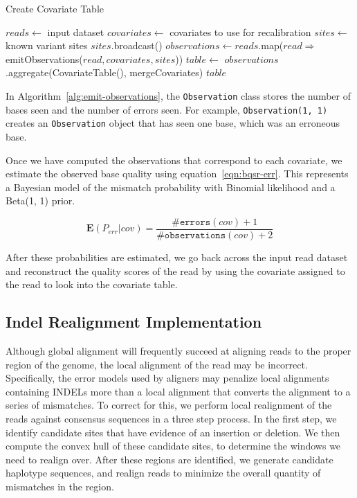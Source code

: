 \documentclass[masters]{ucbthesis}
\begin{document}
\begin{algorithm}
\caption{Create Covariate Table}
\label{alg:create-table}
\begin{algorithmic}
\STATE $reads \leftarrow$ input dataset
\STATE $covariates \leftarrow$ covariates to use for recalibration
\STATE $sites \leftarrow$ known variant sites
\STATE $sites$.broadcast()
\STATE $observations \leftarrow reads$.map($read \Rightarrow$ emitObservations($read, covariates, sites$))
\STATE $table \leftarrow$ $observations$.aggregate(CovariateTable(), mergeCovariates)
\RETURN $table$
\end{algorithmic}
\end{algorithm}

In Algorithm~\ref{alg:emit-observations}, the \texttt{Observation} class stores the number of bases seen
and the number of errors seen. For example, \texttt{Observation(1, 1)} creates an \texttt{Observation} object
that has seen one base, which was an erroneous base.

Once we have computed the observations that correspond to each covariate, we estimate the observed base
quality using equation~\eqref{eqn:bqsr-err}. This represents a Bayesian model of the mismatch probability with
Binomial likelihood and a Beta(1, 1) prior.

\begin{equation}
\label{eqn:bqsr-err}
\mathbf{E}(P_{err}|{cov}) = \frac{\texttt{\#errors}(cov) + 1}{\texttt{\#observations}(cov) + 2}
\end{equation}

After these probabilities are estimated, we go back across the input read dataset and reconstruct the quality
scores of the read by using the covariate assigned to the read to look into the covariate table.

\subsection{Indel Realignment Implementation}
\label{sec:indel-realignment-implementation}

Although global alignment will frequently succeed at aligning reads to the proper region of the genome, the local
alignment of the read may be incorrect. Specifically, the error models used by aligners may penalize local alignments
containing INDELs more than a local alignment that converts the alignment to a series of mismatches. To correct
for this, we perform local realignment of the reads against consensus sequences in a three step
process. In the first step, we identify candidate sites that have evidence of an insertion or deletion. We then compute
the convex hull of these candidate sites, to determine the windows we need to realign over. After these regions are
identified, we generate candidate haplotype sequences, and realign reads to minimize the overall quantity of mismatches
in the region.
\end{document}
